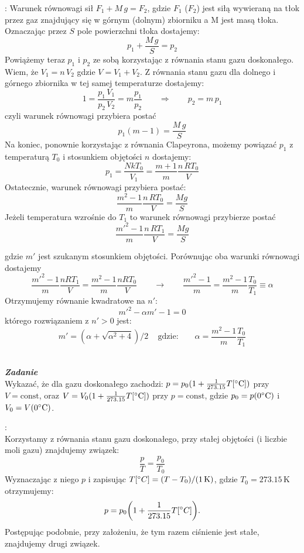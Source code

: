 \documentclass[11pt,a4paper]{article}
\newcounter{zadanie}\newcommand{\zadanie}[1][]{\addtocounter{zadanie}{1} ~\\  {\bf \emph{Zadanie \arabic{zadanie} #1 }} \\}
\begin{document}
\vspace{2mm}{\bf Rozwiązanie}: Warunek równowagi sił $F_1 + M\,g = F_2$, gdzie $F_1$ ($F_2$) jest siłą wywieraną na tłok przez gaz znajdujący się w górnym (dolnym) zbiorniku a M jest masą tłoka. Oznaczając przez $S$ pole powierzchni tłoka dostajemy:
\[
p_1 + \frac{M\,g}{S} = p_2
\]
Powiążemy teraz $p_1$ i $p_2$ ze sobą korzystając z równania stanu gazu doskonałego.
Wiem, że $V_1 = n\,V_2$ gdzie $V = V_1 + V_2$. Z równania stanu gazu dla dolnego i górnego zbiornika w tej samej temperaturze dostajemy:
\[
1=\frac{p_1\,V_1}{p_2\,V_2} = m\frac{p_1}{p_2} \qquad\Rightarrow\qquad p_2=m\,p_1
\]
czyli warunek równowagi przybiera postać
\[
p_1 (m-1) = \frac{M\,g}{S}
\]
Na koniec, ponownie korzystając z równania Clapeyrona, możemy powiązać $p_1$ z temperaturą $T_0$ i stosunkiem objętości $n$ dostajemy:
\[
p_1 = \frac{NkT_0}{V_1} = \frac{m+1}{m}\frac{n\,RT_0}{V}
\]
Ostatecznie, warunek równowagi przybiera postać:
\[
\frac{m^2-1}{m}\frac{n\,RT_0}{V} = \frac{Mg}{S}
\]
Jeżeli temperatura wzrośnie do $T_1$ to warunek równowagi przybierze postać
\[
\frac{m'^2-1}{m}\frac{n\,RT_1}{V} = \frac{Mg}{S}
\]
        
gdzie $m'$ jest szukanym stosunkiem objętości. Porównując oba warunki równowagi dostajemy
\[
\frac{m'^2-1}{m}\frac{n RT_1}{V}=\frac{m^2-1}{m}\frac{n RT_0}{V}
\qquad\to\qquad
\frac{m'^2-1}{m}=\frac{m^2-1}{m}\frac{T_0}{T_1}\equiv \alpha
\]
Otrzymujemy równanie kwadratowe na $n'$:
\[
m'^2 - \alpha m' - 1 = 0
\]
którego rozwiązaniem z $n' > 0$ jest:
\[
m' = (\alpha + \sqrt{\alpha^2 + 4})/2\,\quad\textrm{gdzie:}\qquad \alpha = \frac{m^2-1}{m}\frac{T_0}{T_1}
\]

\clearpage

\zadanie
Wykazać, że dla gazu doskonałego zachodzi: $p = p_0 (1 + \frac{1}{273.15} T[\degree \textrm{C}])$ przy $V = \textrm{const}$,
oraz $V = V_0 (1+ \frac{1}{273.15}  T[\degree \textrm{C}])$ przy $p=\textrm{const}$, gdzie $p_0 =p(0\degree \textrm{C})$ i $V_0 =V(0\degree \textrm{C})$.

\vspace{2mm}{\bf Rozwiązanie}:\\
Korzystamy z równania stanu gazu doskonałego, przy stałej objętości (i liczbie moli gazu) znajdujemy związek:
\[
\frac{p}{T} = \frac{p_0}{T_0}
\]
Wyznaczając z niego $p$ i zapisując $T[\degree C] = (T - T_0)/(1\,\textrm{K})$, gdzie $T_0 = 273.15\,\textrm{K}$ otrzymujemy:
\[
p=p_0 \bigg(1+\frac{1}{273.15}T[\degree C]\bigg) .
\]
Postępując podobnie, przy założeniu, że tym razem ciśnienie jest stałe, znajdujemy drugi związek.
\end{document}
